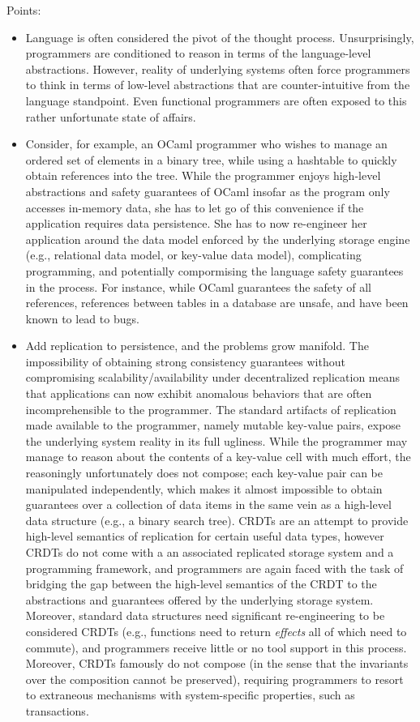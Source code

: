 Points:
\begin{itemize}
  \item Language is often considered the pivot of the thought process.
  Unsurprisingly, programmers are conditioned to reason in terms of
  the language-level abstractions. However, reality of underlying
  systems often force programmers to think in terms of low-level
  abstractions that are counter-intuitive from the language
  standpoint. Even functional programmers are often exposed to this
  rather unfortunate state of affairs.

  \item Consider, for example, an OCaml programmer who wishes to
  manage an ordered set of elements in a binary tree, while using a
  hashtable to quickly obtain references into the tree. While the
  programmer enjoys high-level abstractions and safety guarantees of
  OCaml insofar as the program only accesses in-memory data, she has
  to let go of this convenience if the application requires data
  persistence. She has to now re-engineer her application around the
  data model enforced by the underlying storage engine (e.g.,
  relational data model, or key-value data model), complicating
  programming, and potentially compormising the language safety
  guarantees in the process. For instance, while OCaml guarantees the
  safety of all references, references between tables in a database
  are unsafe, and have been known to lead to bugs.

  \item Add replication to persistence, and the problems grow
  manifold. The impossibility of obtaining strong consistency
  guarantees without compromising scalability/availability under
  decentralized replication means that applications can now exhibit
  anomalous behaviors that are often incomprehensible to the
  programmer. The standard artifacts of replication made available to
  the programmer, namely mutable key-value pairs, expose the underlying
  system reality in its full ugliness. While the programmer may manage
  to reason about the contents of a key-value cell with much effort,
  the reasoningly unfortunately does not compose; each key-value pair
  can be manipulated independently, which makes it almost impossible
  to obtain guarantees over a collection of data items in the same
  vein as a high-level data structure (e.g., a binary search tree).
  CRDTs are an attempt to provide high-level semantics of replication
  for certain useful data types, however CRDTs do not come with a
  an associated replicated storage system and a programming framework,
  and programmers are again faced with the task of bridging the gap
  between the high-level semantics of the CRDT to the abstractions and
  guarantees offered by the underlying storage system. Moreover,
  standard data structures need significant re-engineering to be
  considered CRDTs (e.g., functions need to return \emph{effects} all
  of which need to commute), and programmers receive little or no tool
  support in this process. Moreover, CRDTs famously do not compose (in
  the sense that the invariants over the composition cannot be
  preserved), requiring programmers to resort to extraneous
  mechanisms with system-specific properties, such as transactions.


\end{itemize}
